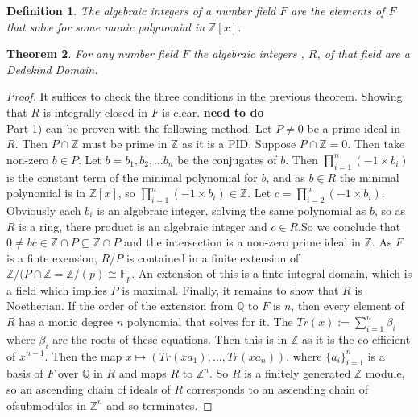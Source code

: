 \documentclass[a4paper,10pt]{article}
\newtheorem{thm}{Theorem}[subsection]
\newtheorem{defn}[thm]{Definition}
\begin{document}
\begin{defn}
The algebraic integers of a number field $F$ are the elements of $F$ that solve for some monic polynomial in $\mathbb{Z}[x]$.
\end{defn}

\begin{thm}
For any number field $F$ the algebraic integers , $R$, of that field are a Dedekind Domain.
\end{thm}
\begin{proof}
It suffices to check the three conditions in the previous theorem. Showing that $R$ is integrally closed in $F$ is clear. \textbf{need to do}
\\ Part 1) can be proven with the following method. Let $P\neq 0$ be a prime ideal in $R$. Then $P\cap \mathbb{Z}$ must be prime in $\mathbb{Z}$ as it is a PID. Suppose $P\cap \mathbb{Z}=0$. Then take non-zero $b\in P$. Let $b=b_{1},b_{2},\ldots b_{n}$ be the conjugates of $b$. Then $\prod_{i=1}^{n}(-1\times b_{i})$ is the constant term of the minimal polynomial for $b$, and as $b\in R$ the minimal polynomial is in $\mathbb{Z}[x]$, so $\prod_{i=1}^{n}(-1\times b_{i})\in \mathbb{Z}$. Let $c=\prod_{i=2}^{n}(-1\times b_{i})$. Obviously each $b_{i}$ is an algebraic integer, solving the same polynomial as $b$, so as $R$ is a ring, there product is an algebraic integer and $c\in R$.So we conclude that $0\neq bc\in \mathbb{Z} \cap P\subseteq \mathbb{Z}\cap P$ and the intersection is a non-zero prime ideal in $\mathbb{Z}$. As $F$ is a finte exension, $R/P$ is contained in a finite extension of $\mathbb{Z}/(P\cap \mathbb{Z}=\mathbb{Z}/(p)\cong \mathbb{F}_{p}$. An extension of this is a finte integral domain, which is a field which implies $P$ is maximal.
\newline Finally, it remains to show that $R$ is Noetherian. If the order of the extension from $\mathbb{Q}$ to $F$ is $n$, then every element of $R$ has a monic degree $n$ polynomial that solves for it. The $Tr(x):=\sum_{i=1}^{n}\beta_{i}$ where $\beta_{i}$ are the roots of these equations. Then this is in $\mathbb{Z}$ as it is the co-efficient of $x^{n-1}$. Then the map $x\mapsto (Tr(xa_{1}),\ldots ,Tr(xa_{n}))$. where $\{a_{i}\}_{i=1}^{n}$ is a basis of $F$ over $\mathbb{Q}$ in $R$ and maps $R$ to $\mathbb{Z}^{n}$. So $R$ is a finitely generated $\mathbb{Z}$ module, so an ascending chain of ideals of $R$ corresponds to an ascending chain of ofsubmodules in $\mathbb{Z}^{n}$ and so terminates.
\end{proof}
\end{document}
